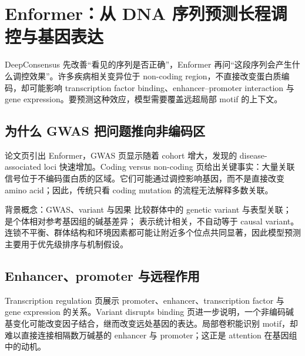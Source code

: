 \section{Enformer：从 DNA 序列预测长程调控与基因表达}

DeepConsensus 先改善“看见的序列是否正确”，Enformer 再问“这段序列会产生什么调控效果”。许多疾病相关变异位于 non-coding region，不直接改变蛋白质编码，却可能影响 transcription factor binding、enhancer--promoter interaction 与 gene expression。要预测这种效应，模型需要覆盖远超局部 motif 的上下文。

\subsection{为什么 GWAS 把问题推向非编码区}

论文页引出 Enformer，GWAS 页显示随着 cohort 增大，发现的 disease-associated loci 快速增加。Coding versus non-coding 页给出关键事实：大量关联信号位于不编码蛋白质的区域。它们可能通过调控影响基因，而不是直接改变 amino acid；因此，传统只看 coding mutation 的流程无法解释多数关联。




\begin{knowledgebox}{背景概念：GWAS、variant 与因果}
 比较群体中的 genetic variant 与表型关联； 是个体相对参考基因组的碱基差异； 表示统计相关，不自动等于 causal variant。连锁不平衡、群体结构和环境因素都可能让附近多个位点共同显著，因此模型预测主要用于优先级排序与机制假设。
\end{knowledgebox}

\subsection{Enhancer、promoter 与远程作用}

Transcription regulation 页展示 promoter、enhancer、transcription factor 与 gene expression 的关系。Variant disrupts binding 页进一步说明，一个非编码碱基变化可能改变因子结合，继而改变远处基因的表达。局部卷积能识别 motif，却难以直接连接相隔数万碱基的 enhancer 与 promoter；这正是 attention 在基因组中的动机。

